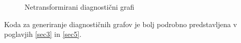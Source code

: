 \begin{figure}[h]
\begin{subfigure}[ht]{0.49\textwidth}
        \label{img:netrans-vpliv-tock-na-model}
    \end{subfigure}
    \caption{Netransformirani diagnostični grafi}
    \label{img:netrans-diagnosticni-grafi}
\end{figure}

Koda za generiranje diagnostičnih grafov je bolj podrobno predstavljena v poglavjih \ref{sec3} in \ref{sec5}.